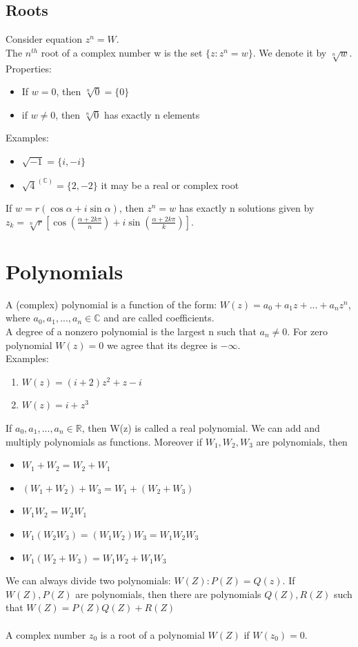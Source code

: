 \documentclass{report}
\begin{document}
\subsection{Roots}
Consider equation $z^n = W$. \\
The $n^{th}$ root of a complex number w is the set $\{z: z^n=w\}$. We denote it by $\sqrt[n]{w}$.
Properties: 
\begin{itemize}
	\item If $w=0$, then $\sqrt[n]{0} = \{0\}$
	\item if $w\neq 0$, then $\sqrt[n]{0}$ has exactly n elements
\end{itemize}
Examples: 
\begin{itemize}
	\item $\sqrt{-1} = \{i, -i\}$
	\item $\sqrt{4}^{(\mathbb{C})} = \{2, -2\}$ it may be a real or complex root
\end{itemize}
If $w = r(\cos\alpha + i\sin\alpha)$, then $z^n=w$ has exactly  n solutions given by 
$z_k = \sqrt[n]{r}[\cos(\frac{\alpha + 2k\pi}{n}) + i\sin(\frac{\alpha + 2k\pi}{k})]$.


\section{Polynomials}
A (complex) polynomial is a function of the form: $W(z) = a_0 + a_1z + ... + a_nz^n$, where $a_0, a_1, ..., a_n \in\mathbb{C}$ and are called coefficients. \\
A degree of a nonzero polynomial is the largest n such that $a_n \neq 0$. For zero polynomial $W(z) = 0$ we agree that its degree is $-\infty$. \\
Examples:
\begin{enumerate}
	\item $W(z) = (i+2)z^2 + z -i$
	\item $W(z) = i + z^3$
\end{enumerate}
If $a_0, a_1, ..., a_n \in\mathbb{R}$, then W(z) is called a real polynomial. We can add and multiply polynomials as functions. Moreover if $W_1, W_2, W_3$ are polynomials, then
\begin{itemize}
	\item $W_1 + W_2 = W_2 + W_1$
	\item $(W_1 + W_2) + W_3 = W_1 + (W_2 + W_3)$
	\item $W_1W_2 = W_2W_1$
	\item $W_1(W_2W_3) = (W_1W_2)W_3 = W_1W_2W_3$
	\item $W_1(W_2 + W_3) = W_1W_2 + W_1W_3$
\end{itemize}
We can always divide two polynomials: $W(Z) : P(Z) = Q(z)$. If $W(Z), P(Z)$ are polynomials, then there are polynomials $Q(Z), R(Z)$ such  that $W(Z) = P(Z)Q(Z) + R(Z)$ \\ \\
A complex number $z_0$ is a root of a polynomial $W(Z)$ if $W(z_0) = 0$.\\ \\
\end{document}
